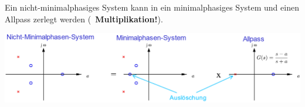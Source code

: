 \label{Beispiel Zerlegung}

Ein nicht-minimalphasiges System kann in ein minimalphasiges System und einen Allpass zerlegt werden
(\textrightarrow\ \textbf{Multiplikation!}). 

\includegraphics[width=\columnwidth]{images/beispiel_minimalphasensystem.png}



